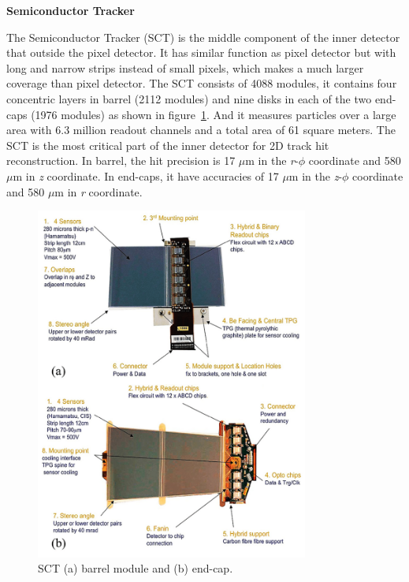 \textbf{Semiconductor Tracker}

The Semiconductor Tracker (SCT) is the middle component of the inner detector that outside the pixel detector.
It has similar function as pixel detector but with long and narrow strips instead of small pixels, which makes a much larger coverage than pixel detector.
The SCT consists of 4088 modules, it contains four concentric layers in barrel (2112 modules) and nine disks in each of the two end-caps (1976 modules) as shown in figure~\ref{fig:inner_sct}.
And it measures particles over a large area with 6.3 million readout channels and a total area of 61 square meters.
The SCT is the most critical part of the inner detector for 2D track hit reconstruction.
In barrel, the hit precision is 17 $\mu$m in the \textit{r}-$\phi$ coordinate and 580 $\mu$m in \textit{z} coordinate.
In end-caps, it have accuracies of 17 $\mu$m in the \textit{z}-$\phi$ coordinate and 580 $\mu$m in \textit{r} coordinate.
\begin{figure}[!htb]
  \centering
  \includegraphics[width=0.8\textwidth]{figures/Detector/inner_SCT.png}
  \caption{SCT (a) barrel module and (b) end-cap\cite{Sultan:phdthesis}.}
  \label{fig:inner_sct}
\end{figure}

